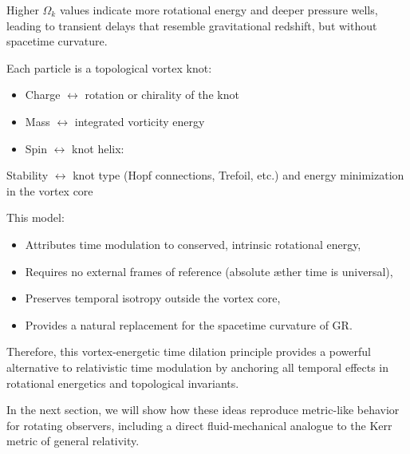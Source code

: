 Higher $\Omega_k$ values indicate more rotational energy and deeper pressure wells, leading to transient delays that resemble gravitational redshift, but without spacetime curvature.

Each particle is a topological vortex knot:
\begin{itemize}
    \item Charge $\leftrightarrow$ rotation or chirality of the knot
    \item Mass $\leftrightarrow$ integrated vorticity energy
    \item Spin $\leftrightarrow$ knot helix:
\end{itemize}
Stability $\leftrightarrow$ knot type (Hopf connections, Trefoil, etc.) and energy minimization in the vortex core

This model:

\begin{itemize}
    \item Attributes time modulation to conserved, intrinsic rotational energy,
    \item Requires no external frames of reference (absolute æther time is universal),
    \item Preserves temporal isotropy outside the vortex core,
    \item Provides a natural replacement for the spacetime curvature of GR. \end{itemize}

Therefore, this vortex-energetic time dilation principle provides a powerful alternative to relativistic time modulation by anchoring all temporal effects in rotational energetics and topological invariants.

In the next section, we will show how these ideas reproduce metric-like behavior for rotating observers, including a direct fluid-mechanical analogue to the Kerr metric of general relativity.
